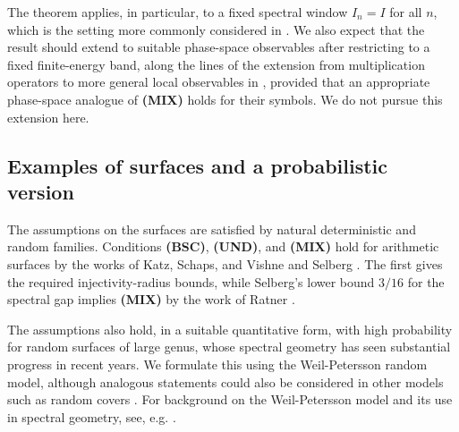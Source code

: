 \documentclass[11pt,twoside,reqno]{amsart}
\newcommand{\1}{\mathrm{\mathbf{1}}}
\numberwithin{equation}{section}
\theoremstyle{plain}
\theoremstyle{definition}
\theoremstyle{remark}
\begin{document}
The theorem applies, in particular, to a fixed spectral window $I_n=I$ for all $n$, which is the setting more commonly considered in \cite{lemassonQuantumErgodicityBenjaminiSchramm2017,lemassonQuantumErgodicityEisenstein2024,abertEigenfunctionsRandomWaves2018,peterson2023quantumergodicitybruhattitsbuilding,brumley2020quantumergodicitycompactquotients,brumley2026quantumergodicitybenjaminischrammlimit,Hippi,Anantharaman2022,bordenave2026quantummixinglargeschreier,AnantharamanSabri2019,AnantharamanSabriAnnals,brooks2015quantumergodicityaveragingoperators}. We also expect that the result should extend to suitable phase-space observables after restricting to a fixed finite-energy band, along the lines of the extension from multiplication operators to more general local observables in \cite{abertEigenfunctionsRandomWaves2018,AnantharamanSaha,Gavelli2026}, provided that an appropriate phase-space analogue of \textbf{(MIX)} holds for their symbols. We do not pursue this extension here.

\subsection{Examples of surfaces and a probabilistic version}

The assumptions on the surfaces are satisfied by natural deterministic and
random families. Conditions \textbf{(BSC)}, \textbf{(UND)}, and
\textbf{(MIX)} hold for arithmetic surfaces by the works of Katz, Schaps, and
Vishne \cite{KatzSchapsVishne2007} and Selberg \cite{Selberg1965}. The first
gives the required injectivity-radius bounds, while Selberg's lower bound
$3/16$ for the spectral gap implies \textbf{(MIX)} by the work of Ratner
\cite{Ratner}.

The assumptions also hold, in a suitable quantitative form, with high
probability for random surfaces of large genus, whose spectral geometry has
seen substantial progress in recent years. We formulate this using the
Weil-Petersson random model, although analogous statements could also be
considered in other models such as random covers \cite{MageeNaudPuder}. For
background on the Weil-Petersson model and its use in spectral geometry, see,
e.g.
\cite{mirzakhaniGrowthWeilPeterssonVolumes2013,Wright2020,
AnantharamanMonk2023,gilmoreShortGeodesicLoops2021,
monkBenjaminiSchrammConvergence2022}.
\end{document}
